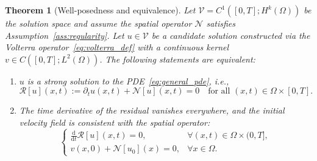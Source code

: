 \documentclass[11pt,reqno]{amsart}
\theoremstyle{plain}
\newtheorem{theorem}{Theorem}[section]
\theoremstyle{definition}
\theoremstyle{remark}
\begin{document}
\begin{theorem}[Well-posedness and equivalence]\label{thm:equivalence}
Let $\mathcal{V} = C^1([0,T]; H^k(\Omega))$ be the solution space and assume the spatial operator $\mathcal{N}$ satisfies Assumption~\ref{ass:regularity}. Let $u \in \mathcal{V}$ be a candidate solution constructed via the Volterra operator~\eqref{eq:volterra_def} with a continuous kernel $v \in C([0,T]; L^2(\Omega))$. The following statements are equivalent:

\begin{enumerate}[label=(\roman*)]
    \item $u$ is a strong solution to the PDE~\eqref{eq:general_pde}, i.e., 
    \begin{equation}
        \mathcal{R}[u](x,t) := \partial_t u(x,t) + \mathcal{N}[u](x,t) = 0 \quad \text{for all } (x,t) \in \Omega \times [0,T].
    \end{equation}
    
    \item The time derivative of the residual vanishes everywhere, and the initial velocity field is consistent with the spatial operator:
    \begin{equation}\label{eq:differentiated_system}
    \begin{cases}
    \displaystyle\frac{\mathrm{d}}{\mathrm{d}t}\mathcal{R}[u](x,t) = 0, 
    & \forall (x,t) \in \Omega \times (0,T], \\[0.3em]
    v(x,0) + \mathcal{N}[u_0](x) = 0, 
    & \forall x \in \Omega.
    \end{cases}
    \end{equation}
\end{enumerate}
\end{theorem}
\end{document}

